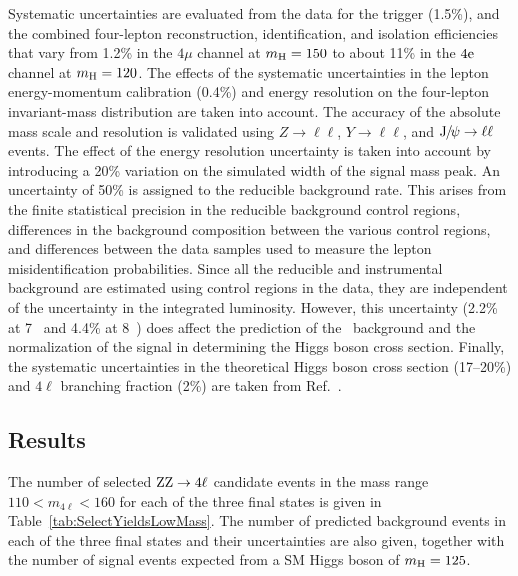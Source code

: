 \documentclass[12pt,twoside,a4paper,cmspaper,final,collab]{cms-tdr}
\begin{document}
Systematic uncertainties are evaluated from the data for the trigger (1.5\%), and the combined four-lepton reconstruction,
identification, and isolation efficiencies that vary from 1.2\% in the $4\mu$ channel at $m_{\mathrm{H}}=150$\GeV
to about 11\% in the $4\mathrm{e}$ channel at  $m_{\mathrm{H}}=120$\GeV.
The effects of the systematic uncertainties in the lepton energy-momentum calibration  (0.4\%) and energy resolution
on the four-lepton invariant-mass distribution are taken into account.
The accuracy of the absolute mass scale and resolution is validated using
$Z \to \ell\ell$, $Y \to \ell\ell$, and  $\mathrm{J}\hspace{-.08em}/\hspace{-.14em}\psi \to \ell\ell$ events.
The effect of the energy resolution uncertainty is taken into account by introducing a 20\%
variation on the simulated width of the signal mass peak.
An uncertainty of  50\% is assigned to the reducible background rate.
This arises from the finite statistical precision in the reducible background
control regions,  differences in the background composition between the
various control regions,
and  differences between the data samples used to measure  the lepton
misidentification probabilities.
Since all the reducible and instrumental background  are estimated using control regions in the data,
they are independent of the uncertainty in the integrated luminosity.
However, this uncertainty (2.2\% at 7\TeV~\cite{CMS-PAS-SMP-12-008} and 4.4\% at 8\TeV~\cite{CMS:2012jza})
does affect the prediction of the \cPZ\cPZ\ background and the
normalization of the signal in determining the Higgs boson cross section.
Finally, the systematic uncertainties in the theoretical Higgs boson cross section (17--20\%) and $4\ell$
branching fraction (2\%) are taken from Ref.~\cite{LHCHiggsCrossSectionWorkingGroup:2011ti}.


\subsection{Results}

The number of selected $\mathrm{Z}\mathrm{Z}\rightarrow 4\ell$ candidate events in the mass range $110 < m_{4\ell} < 160$\GeV
for each of the three final states is given in Table~\ref{tab:SelectYieldsLowMass}.
The number of predicted background events  in each of the three final states and their uncertainties are also given,
together with the number of signal events expected from a SM Higgs boson
of $m_{\mathrm{H}} = 125$\GeV.
\end{document}
